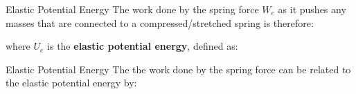 \documentclass[12pt,compress,aspectratio=169]{beamer}
\begin{document}
\begin{frame}{Elastic Potential Energy}
  \vspace{-.15in}The work done by the spring force $W_e$ as it pushes any
  masses that are connected to a compressed/stretched spring is therefore:


  where $U_e$ is the \textbf{elastic potential energy}, defined as:
  
\end{frame}



\begin{frame}{Elastic Potential Energy}
  The the work done by the spring force can be related to the elastic
  potential energy by:
  

\end{frame}
\end{document}
